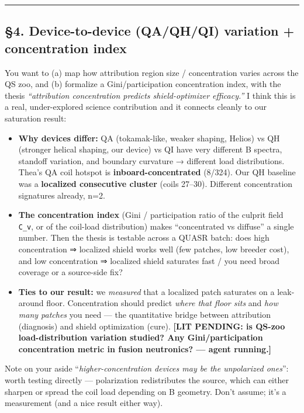 \documentclass[
]{article}
\providecommand{\tightlist}{%
  \setlength{\itemsep}{0pt}\setlength{\parskip}{0pt}}
\begin{document}
\begin{center}\rule{0.5\linewidth}{0.5pt}\end{center}

\subsection{§4. Device-to-device (QA/QH/QI) variation + concentration
index}\label{device-to-device-qaqhqi-variation-concentration-index}

You want to (a) map how attribution region size / concentration varies
across the QS zoo, and (b) formalize a Gini/participation concentration
index, with the thesis \emph{``attribution concentration predicts
shield-optimizer efficacy.''} I think this is a real, under-explored
science contribution and it connects cleanly to our saturation result:

\begin{itemize}
\tightlist
\item
  \textbf{Why devices differ:} QA (tokamak-like, weaker shaping, Helios)
  vs QH (stronger helical shaping, our device) vs QI have very different
  \textbar B\textbar{} spectra, standoff variation, and boundary
  curvature → different load distributions. Thea's QA coil hotspot is
  \textbf{inboard-concentrated} (8/324). Our QH baseline was a
  \textbf{localized consecutive cluster} (coils 27--30). Different
  concentration signatures already, n=2.
\item
  \textbf{The concentration index} (Gini / participation ratio of the
  culprit field \texttt{C\_v}, or of the coil-load distribution) makes
  ``concentrated vs diffuse'' a single number. Then the thesis is
  testable across a QUASR batch: does high concentration ⇒ localized
  shield works well (few patches, low breeder cost), and low
  concentration ⇒ localized shield saturates fast / you need broad
  coverage or a source-side fix?
\item
  \textbf{Ties to our result:} we \emph{measured} that a localized patch
  saturates on a leak-around floor. Concentration should predict
  \emph{where that floor sits} and \emph{how many patches} you need ---
  the quantitative bridge between attribution (diagnosis) and shield
  optimization (cure). \textbf{{[}LIT PENDING: is QS-zoo
  load-distribution variation studied? Any Gini/participation
  concentration metric in fusion neutronics? --- agent running.{]}}
\end{itemize}

Note on your aside ``\emph{higher-concentration devices may be the
unpolarized ones}'': worth testing directly --- polarization
redistributes the source, which can either sharpen or spread the coil
load depending on B geometry. Don't assume; it's a measurement (and a
nice result either way).
\end{document}
